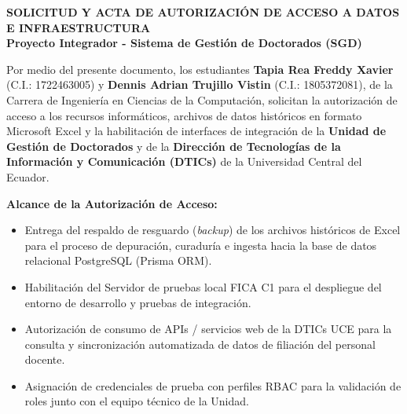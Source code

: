 
\pagestyle{empty}
\onehalfspacing
\fontsize{12}{18}\selectfont

\begin{center}
    \textbf{\Large SOLICITUD Y ACTA DE AUTORIZACIÓN DE ACCESO A DATOS E INFRAESTRUCTURA} \\[0.3cm]
    \textbf{\small Proyecto Integrador - Sistema de Gestión de Doctorados (SGD)}
\end{center}

\vspace{0.6cm}

Por medio del presente documento, los estudiantes \textbf{Tapia Rea Freddy Xavier} (C.I.: 1722463005) y \textbf{Dennis Adrian Trujillo Vistin} (C.I.: 1805372081), de la Carrera de Ingeniería en Ciencias de la Computación, solicitan la autorización de acceso a los recursos informáticos, archivos de datos históricos en formato Microsoft Excel y la habilitación de interfaces de integración de la \textbf{Unidad de Gestión de Doctorados} y de la \textbf{Dirección de Tecnologías de la Información y Comunicación (DTICs)} de la Universidad Central del Ecuador.

\vspace{0.4cm}

\textbf{Alcance de la Autorización de Acceso:}
\begin{itemize}[leftmargin=*,noitemsep]
    \item Entrega del respaldo de resguardo (\textit{backup}) de los archivos históricos de Excel para el proceso de depuración, curaduría e ingesta hacia la base de datos relacional PostgreSQL (Prisma ORM).
    \item Habilitación del Servidor de pruebas local FICA C1 para el despliegue del entorno de desarrollo y pruebas de integración.
    \item Autorización de consumo de APIs / servicios web de la DTICs UCE para la consulta y sincronización automatizada de datos de filiación del personal docente.
    \item Asignación de credenciales de prueba con perfiles RBAC para la validación de roles junto con el equipo técnico de la Unidad.
\end{itemize}

\vspace{1.2cm}

